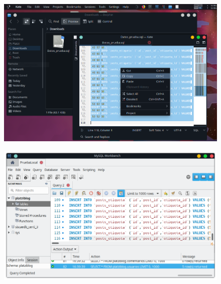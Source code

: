 \documentclass{article}
\begin{document}
\begin{figure}[h!]
  \centering
  \includegraphics[scale=0.65]{./Pictures/162_wb_datos_prueba.png}
\end{figure}

\begin{figure}[h!]
  \centering
  \includegraphics[scale=0.65]{./Pictures/163_wb_datos_prueba.png}
\end{figure}

%
%
\end{document}
